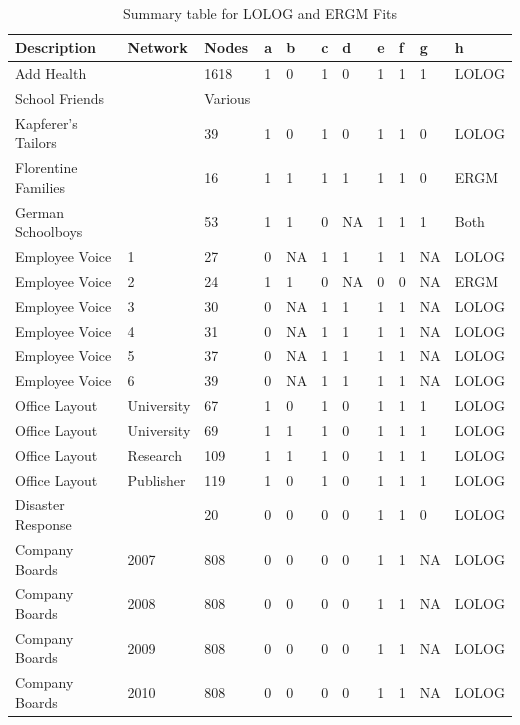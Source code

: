 \documentclass[
]{statsoc}
\begin{document}
\begin{table}
\caption{\label{tab:summary_table} Summary table for LOLOG and ERGM Fits}\\
\begin{tabular}[t]{lllllllllll}
\toprule
Description & Network & Nodes & a & b & c & d & e & f & g & h\\
\midrule
\rowcolor{gray!6}  Add Health &  & 1618 & 1 & 0 & 1 & 0 & 1 & 1 & 1 & LOLOG\\
School Friends &  & Various &  &  &  &  &  &  &  & \\
\rowcolor{gray!6}  Kapferer's Tailors &  & 39 & 1 & 0 & 1 & 0 & 1 & 1 & 0 & LOLOG\\
Florentine Families &  & 16 & 1 & 1 & 1 & 1 & 1 & 1 & 0 & ERGM\\
\rowcolor{gray!6}  German Schoolboys &  & 53 & 1 & 1 & 0 & NA & 1 & 1 & 1 & Both\\
\addlinespace
Employee Voice & 1 & 27 & 0 & NA & 1 & 1 & 1 & 1 & NA & LOLOG\\
\rowcolor{gray!6}  Employee Voice & 2 & 24 & 1 & 1 & 0 & NA & 0 & 0 & NA & ERGM\\
Employee Voice & 3 & 30 & 0 & NA & 1 & 1 & 1 & 1 & NA & LOLOG\\
\rowcolor{gray!6}  Employee Voice & 4 & 31 & 0 & NA & 1 & 1 & 1 & 1 & NA & LOLOG\\
Employee Voice & 5 & 37 & 0 & NA & 1 & 1 & 1 & 1 & NA & LOLOG\\
\addlinespace
\rowcolor{gray!6}  Employee Voice & 6 & 39 & 0 & NA & 1 & 1 & 1 & 1 & NA & LOLOG\\
Office Layout & University & 67 & 1 & 0 & 1 & 0 & 1 & 1 & 1 & LOLOG\\
\rowcolor{gray!6}  Office Layout & University & 69 & 1 & 1 & 1 & 0 & 1 & 1 & 1 & LOLOG\\
Office Layout & Research & 109 & 1 & 1 & 1 & 0 & 1 & 1 & 1 & LOLOG\\
\rowcolor{gray!6}  Office Layout & Publisher & 119 & 1 & 0 & 1 & 0 & 1 & 1 & 1 & LOLOG\\
\addlinespace
Disaster Response &  & 20 & 0 & 0 & 0 & 0 & 1 & 1 & 0 & LOLOG\\
\rowcolor{gray!6}  Company Boards & 2007 & 808 & 0 & 0 & 0 & 0 & 1 & 1 & NA & LOLOG\\
Company Boards & 2008 & 808 & 0 & 0 & 0 & 0 & 1 & 1 & NA & LOLOG\\
\rowcolor{gray!6}  Company Boards & 2009 & 808 & 0 & 0 & 0 & 0 & 1 & 1 & NA & LOLOG\\
Company Boards & 2010 & 808 & 0 & 0 & 0 & 0 & 1 & 1 & NA & LOLOG\\

\end{tabular}
\end{table}
\end{document}
